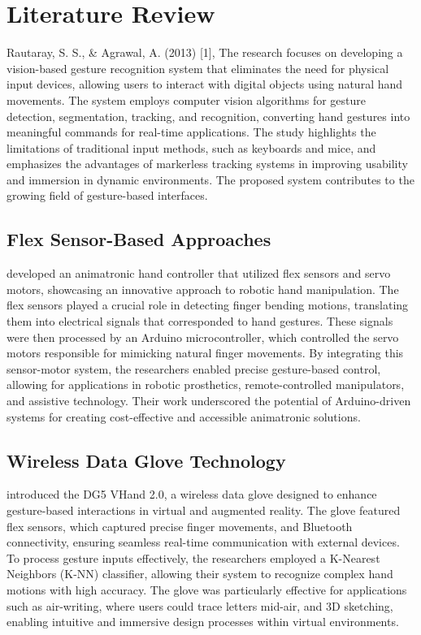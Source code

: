 \section{Literature Review}
\label{sec:literature}

Rautaray, S. S., & Agrawal, A. (2013) [1], The research focuses on developing a vision-based gesture recognition system that eliminates the need for physical input devices, allowing users to interact with digital objects using natural hand movements. The system employs computer vision algorithms for gesture detection, segmentation, tracking, and recognition, converting hand gestures into meaningful commands for real-time applications. The study highlights the limitations of traditional input methods, such as keyboards and mice, and emphasizes the advantages of markerless tracking systems in improving usability and immersion in dynamic environments. The proposed system contributes to the growing field of gesture-based interfaces.

\subsection{Flex Sensor-Based Approaches}
\citet{Chowdhury2013} developed an animatronic hand controller that utilized flex sensors and servo motors, showcasing an innovative approach to robotic hand manipulation. The flex sensors played a crucial role in detecting finger bending motions, translating them into electrical signals that corresponded to hand gestures. These signals were then processed by an Arduino microcontroller, which controlled the servo motors responsible for mimicking natural finger movements. By integrating this sensor-motor system, the researchers enabled precise gesture-based control, allowing for applications in robotic prosthetics, remote-controlled manipulators, and assistive technology. Their work underscored the potential of Arduino-driven systems for creating cost-effective and accessible animatronic solutions.

\subsection{Wireless Data Glove Technology}
\citet{Kumar2012} introduced the DG5 VHand 2.0, a wireless data glove designed to enhance gesture-based interactions in virtual and augmented reality. The glove featured flex sensors, which captured precise finger movements, and Bluetooth connectivity, ensuring seamless real-time communication with external devices. To process gesture inputs effectively, the researchers employed a K-Nearest Neighbors (K-NN) classifier, allowing their system to recognize complex hand motions with high accuracy. The glove was particularly effective for applications such as air-writing, where users could trace letters mid-air, and 3D sketching, enabling intuitive and immersive design processes within virtual environments.

